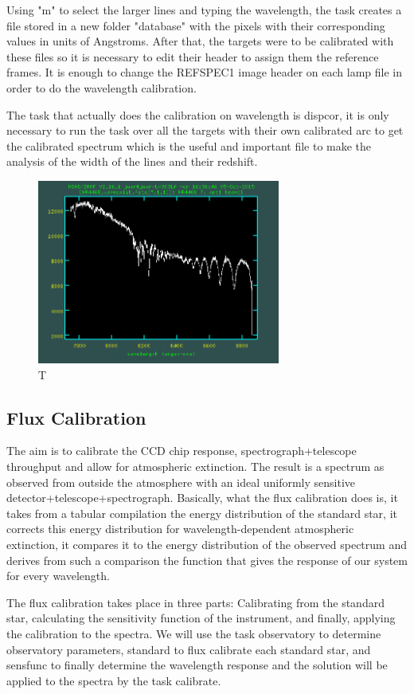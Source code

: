 Using "m" to select the larger lines and typing the wavelength, the task creates a file stored in a new folder "database" with the pixels with their corresponding values in units of Angstroms. After that, the targets were to be calibrated with these files so it is necessary to edit their header to assign them the reference frames. It is enough to change the REFSPEC1 image header on each lamp file in order to do the wavelength calibration. 

The task that actually does the calibration on wavelength is dispcor, it is only necessary to run the task over all the targets with their own calibrated arc to get the calibrated spectrum which is the useful and important file to make the analysis of the width of the lines and their redshift.

\begin{figure}[h]
\centering
\includegraphics[width=8cm]{images/calib_star_wave.png}
\caption{T}
\end{figure}

\subsection{Flux Calibration}

The aim is to calibrate the CCD chip response, spectrograph+telescope throughput and allow for atmospheric extinction. The result is a spectrum as observed from outside the atmosphere with an ideal uniformly sensitive detector+telescope+spectrograph. Basically, what the flux calibration does is, it takes from a tabular compilation the energy distribution of the standard star, it corrects this energy distribution for wavelength-dependent atmospheric extinction, it compares it to the energy distribution of the observed spectrum and derives from such a comparison the function that gives the response of our system for every wavelength.

The flux calibration takes place in three parts: Calibrating from the standard star, calculating the sensitivity function of the instrument, and finally, applying the calibration to the spectra. We will use the task observatory to determine observatory parameters, standard to flux calibrate each standard star, and sensfunc to finally determine the wavelength response and the solution will be applied to the spectra by the task calibrate.

